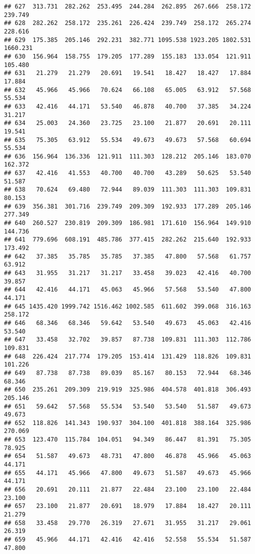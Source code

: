 \documentclass[
]{article}
\begin{document}
\begin{verbatim}
## 627  313.731  282.262  253.495  244.284  262.895  267.666  258.172  239.749
## 628  282.262  258.172  235.261  226.424  239.749  258.172  265.274  228.616
## 629  175.385  205.146  292.231  382.771 1095.538 1923.205 1802.531 1660.231
## 630  156.964  158.755  179.205  177.289  155.183  133.054  121.911  105.480
## 631   21.279   21.279   20.691   19.541   18.427   18.427   17.884   17.884
## 632   45.966   45.966   70.624   66.108   65.005   63.912   57.568   55.534
## 633   42.416   44.171   53.540   46.878   40.700   37.385   34.224   31.217
## 634   25.003   24.360   23.725   23.100   21.877   20.691   20.111   19.541
## 635   75.305   63.912   55.534   49.673   49.673   57.568   60.694   55.534
## 636  156.964  136.336  121.911  111.303  128.212  205.146  183.070  162.372
## 637   42.416   41.553   40.700   40.700   43.289   50.625   53.540   51.587
## 638   70.624   69.480   72.944   89.039  111.303  111.303  109.831   80.153
## 639  356.381  301.716  239.749  209.309  192.933  177.289  205.146  277.349
## 640  260.527  230.819  209.309  186.981  171.610  156.964  149.910  144.736
## 641  779.696  608.191  485.786  377.415  282.262  215.640  192.933  173.492
## 642   37.385   35.785   35.785   37.385   47.800   57.568   61.757   63.912
## 643   31.955   31.217   31.217   33.458   39.023   42.416   40.700   39.857
## 644   42.416   44.171   45.063   45.966   57.568   53.540   47.800   44.171
## 645 1435.420 1999.742 1516.462 1002.585  611.602  399.068  316.163  258.172
## 646   68.346   68.346   59.642   53.540   49.673   45.063   42.416   53.540
## 647   33.458   32.702   39.857   87.738  109.831  111.303  112.786  109.831
## 648  226.424  217.774  179.205  153.414  131.429  118.826  109.831  101.226
## 649   87.738   87.738   89.039   85.167   80.153   72.944   68.346   68.346
## 650  235.261  209.309  219.919  325.986  404.578  401.818  306.493  205.146
## 651   59.642   57.568   55.534   53.540   53.540   51.587   49.673   49.673
## 652  118.826  141.343  190.937  304.100  401.818  388.164  325.986  270.069
## 653  123.470  115.784  104.051   94.349   86.447   81.391   75.305   78.925
## 654   51.587   49.673   48.731   47.800   46.878   45.966   45.063   44.171
## 655   44.171   45.966   47.800   49.673   51.587   49.673   45.966   44.171
## 656   20.691   20.111   21.877   22.484   23.100   23.100   22.484   23.100
## 657   23.100   21.877   20.691   18.979   17.884   18.427   20.111   21.279
## 658   33.458   29.770   26.319   27.671   31.955   31.217   29.061   26.319
## 659   45.966   44.171   42.416   42.416   52.558   55.534   51.587   47.800

\end{verbatim}
\end{document}
